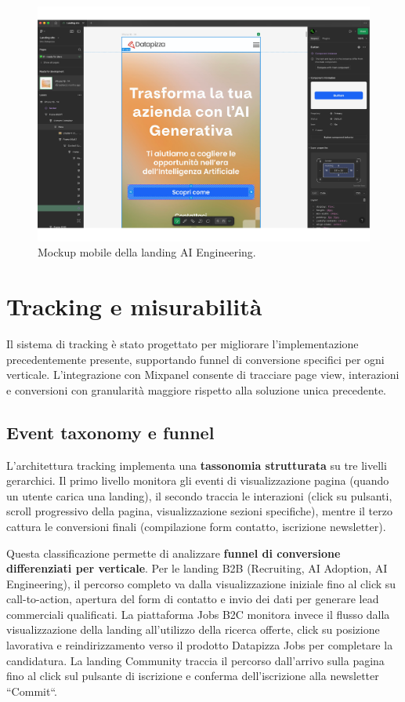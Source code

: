 \clearpage
\begin{figure}[h!]
    \centering
    \includegraphics[width=1.06\textwidth]{chapters/figures/mockup2.pdf}
    \caption{Mockup mobile della landing AI Engineering.}
    \label{fig:ai-eng-mobile}
\end{figure}
\clearpage

\section{Tracking e misurabilità}
Il sistema di tracking è stato progettato per migliorare l'implementazione 
precedentemente presente, supportando funnel di conversione specifici per ogni 
verticale. L'integrazione con Mixpanel consente di tracciare page view, 
interazioni e conversioni con granularità maggiore rispetto alla soluzione unica 
precedente.

\subsection{Event taxonomy e funnel}
L'architettura tracking implementa una \textbf{tassonomia strutturata} 
su tre livelli gerarchici. Il primo livello monitora gli eventi di 
visualizzazione pagina (quando un utente carica una landing), il secondo 
traccia le interazioni (click su pulsanti, scroll progressivo della pagina, 
visualizzazione sezioni specifiche), mentre il terzo cattura le conversioni 
finali (compilazione form contatto, iscrizione newsletter).

Questa classificazione permette di analizzare \textbf{funnel di conversione 
differenziati per verticale}. Per le landing B2B (Recruiting, AI Adoption, 
AI Engineering), il percorso completo va dalla visualizzazione iniziale 
fino al click su call-to-action, apertura del form di contatto e invio 
dei dati per generare lead commerciali qualificati. La piattaforma Jobs 
B2C monitora invece il flusso dalla visualizzazione della landing all'utilizzo 
della ricerca offerte, click su posizione lavorativa e reindirizzamento 
verso il prodotto Datapizza Jobs per completare la candidatura. La landing 
Community traccia il percorso dall'arrivo sulla pagina fino al click sul 
pulsante di iscrizione e conferma dell'iscrizione alla newsletter ``Commit``.


